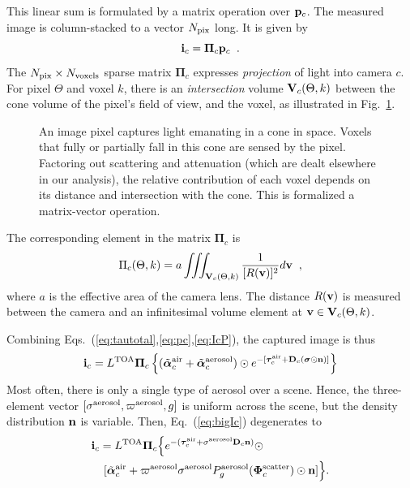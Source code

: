 \documentclass[10pt,twocolumn,letterpaper]{article}
\newcommand{\vect}[1]{\bm{#1}}
\newcommand{\yoavcomment}[1]{}
\renewcommand{\yoavcomment}[1]{#1} %
\begin{document}
This linear sum is formulated by a matrix operation over ${\bf
  p}_c$. The measured image is column-stacked to a vector $N_{\rm
  pix}$ long. It is given by
\begin{equation}
  {\bf i}_c= {\vect{\Pi}}_c{\bf p}_c
  \;\;.
  \label{eq:IcP}
\end{equation}
The $N_{\rm pix}\times N_{\rm voxels}$ sparse matrix ${\vect{\Pi}}_c$
expresses {\em projection} of light into camera $c$. For pixel
$\Theta$ and voxel $k$, there is an {\em intersection} volume ${\bf
  V}_c(\Theta,k)$ between the cone volume of the pixel's field of
view, and the voxel, as illustrated in Fig.~\ref{fig:projection}.
\begin{figure}
  \centering
  \yoavcomment{\def\svgwidth{\columnwidth}}
  \caption{\small An image pixel captures light emanating in a cone in
    space. Voxels that fully or partially fall in this cone are sensed
    by the pixel. Factoring out scattering and attenuation (which are
    dealt elsewhere in our analysis), the relative contribution of
    each voxel depends on its distance and intersection with the
    cone. This is formalized a matrix-vector operation.}
  \label{fig:projection}
\end{figure}
The corresponding element in the matrix ${\vect{\Pi}}_c$ is
\begin{equation}
  \Pi_c(\Theta,k)=
  a
  \iiint_{{\bf V}_c(\Theta,k)}
  \frac{1}{[R({\bf v})]^2} d{\bf v}
  \;\;,
  \label{eq:Pc}
\end{equation}
where $a$ is the effective area of the camera lens.
The distance $R({\bf v})$ is measured between the camera and an
infinitesimal volume element at ${\bf v}\in {\bf V}_c(\Theta,k)$.

Combining Eqs.~(\ref{eq:tautotal},\ref{eq:pc},\ref{eq:IcP}), the
captured image is thus
\begin{align}
  {\bf i}_c= L^{\rm TOA} {\vect{\Pi}}_c \left\{
    (\tilde{\vect{\alpha}}^{\rm air}_c + \tilde{\vect{\alpha}}^{\rm
      aerosol}_c) \odot e^{-[\vect{\tau}_c^{\rm air} + {\bf D}_c
      (\vect{\sigma} \odot {\bf n})]} \right\}
  \label{eq:bigIc}
\end{align}
Most often, there is only a single type of aerosol over a
scene. Hence, the three-element vector $[{\sigma}^{\rm
  aerosol},\varpi^{\rm aerosol},g]$ is uniform across the scene, but
the density distribution ${\bf n}$ is variable. Then,
Eq.~(\ref{eq:bigIc}) degenerates to
\begin{align}
  {\bf i}_c= L^{\rm TOA} {\vect{\Pi}}_c \Big\{ e^{-(\vect{\tau}_c^{\rm
      air} + {\sigma}^{\rm aerosol} {\bf D}_c {\bf n}) }\odot
  \;\;\;\;\;\;\;\;\;\;\;\;\;\;\;\;\;\;\;\;\;
  \nonumber \\
  [\tilde{\vect{\alpha}}^{\rm air}_c + %
  \varpi^{\rm aerosol}\sigma^{\rm aerosol} P^{\rm
    aerosol}_g(\vect{\Phi}^{\rm scatter}_c) \odot{\bf n} ] \Big\} .
  \label{eq:bigIA}
\end{align}
\end{document}
